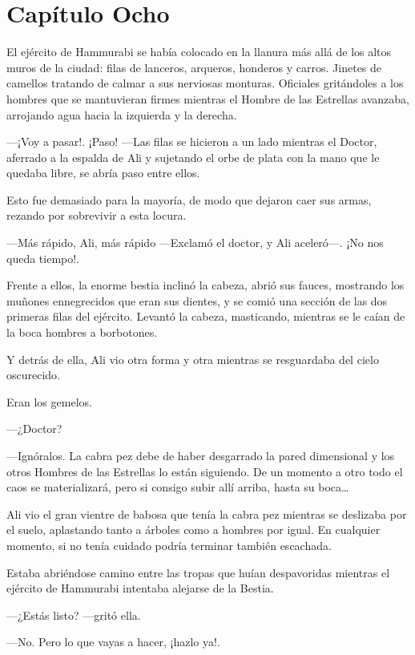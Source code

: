 \chapter*{Capítulo Ocho}

El ejército de Hammurabi se había colocado en la llanura más allá de los
altos muros de la ciudad: filas de lanceros, arqueros, honderos y
carros. Jinetes de camellos tratando de calmar a sus nerviosas monturas.
Oficiales gritándoles a los hombres que se mantuvieran firmes mientras
el Hombre de las Estrellas avanzaba, arrojando agua hacia la izquierda y
la derecha.

---¡Voy a pasar!. ¡Paso! ---Las filas se hicieron a un lado mientras el
Doctor, aferrado a la espalda de Ali y sujetando el orbe de plata con la
mano que le quedaba libre, se abría paso entre ellos.

Esto fue demasiado para la mayoría, de modo que dejaron caer sus armas,
rezando por sobrevivir a esta locura.

---Más rápido, Ali, más rápido ---Exclamó el doctor, y Ali aceleró---.
¡No nos queda tiempo!.

Frente a ellos, la enorme bestia inclinó la cabeza, abrió sus fauces,
mostrando los muñones ennegrecidos que eran sus dientes, y se comió una
sección de las dos primeras filas del ejército. Levantó la cabeza,
masticando, mientras se le caían de la boca hombres a borbotones.

Y detrás de ella, Ali vio otra forma y otra mientras se resguardaba del
cielo oscurecido.

Eran los gemelos.

---¿Doctor?

---Ignóralos. La cabra pez debe de haber desgarrado la pared dimensional
y los otros Hombres de las Estrellas lo están siguiendo. De un momento a
otro todo el caos se materializará, pero si consigo subir allí arriba,
hasta su boca\ldots{}

Ali vio el gran vientre de babosa que tenía la cabra pez mientras se
deslizaba por el suelo, aplastando tanto a árboles como a hombres por
igual. En cualquier momento, si no tenía cuidado podría terminar también
escachada.

Estaba abriéndose camino entre las tropas que huían despavoridas
mientras el ejército de Hammurabi intentaba alejarse de la Bestia.

---¿Estás listo? ---gritó ella.

---No. Pero lo que vayas a hacer, ¡hazlo ya!.

